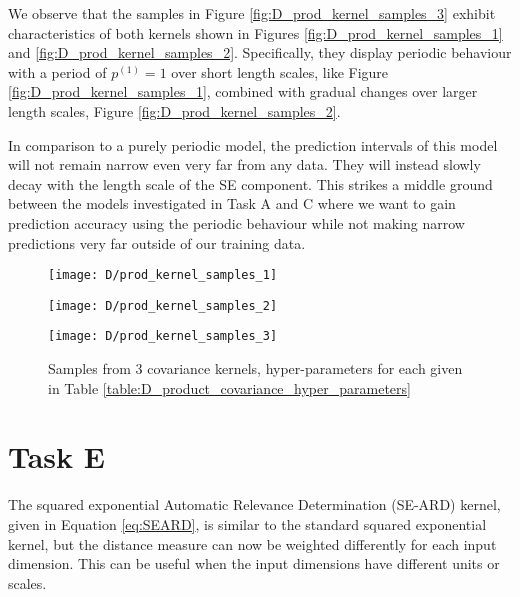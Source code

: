 \documentclass[11pt]{article}
\begin{document}
We observe that the samples in Figure \ref{fig:D_prod_kernel_samples_3} exhibit characteristics of both kernels shown in Figures \ref{fig:D_prod_kernel_samples_1} and \ref{fig:D_prod_kernel_samples_2}. Specifically, they display periodic behaviour with a period of $p^{(1)} = 1$ over short length scales, like Figure \ref{fig:D_prod_kernel_samples_1}, combined with gradual changes over larger length scales, Figure \ref{fig:D_prod_kernel_samples_2}.

In comparison to a purely periodic model, the prediction intervals of this model will not remain narrow even very far from any data. They will instead slowly decay with the length scale of the SE component. This strikes a middle ground between the models investigated in Task A and C where we want to gain prediction accuracy using the periodic behaviour while not making narrow predictions very far outside of our training data.


\begin{figure}[h]
    \centering
    \begin{minipage}{0.3\textwidth}
        \centering
        \texttt{[image: D/prod\_kernel\_samples\_1]} 
        \label{fig:D_prod_kernel_samples_1}
    \end{minipage}
    \begin{minipage}{0.3\textwidth}
        \centering
        \texttt{[image: D/prod\_kernel\_samples\_2]} 
        \label{fig:D_prod_kernel_samples_2}
    \end{minipage}
    \begin{minipage}{0.3\textwidth}
        \centering
        \texttt{[image: D/prod\_kernel\_samples\_3]} 
        \label{fig:D_prod_kernel_samples_3}
    \end{minipage}

    \caption{Samples from 3 covariance kernels, hyper-parameters for each given in Table \ref{table:D_product_covariance_hyper_parameters}}
    \label{fig:D_prod_kernel_samples}
\end{figure}

\section{Task E}

The squared exponential Automatic Relevance Determination (SE-ARD) kernel, given in Equation \ref{eq:SEARD}, is similar to the standard squared exponential kernel, but the distance measure can now be weighted differently for each input dimension. This can be useful when the input dimensions have different units or scales. 
\end{document}
